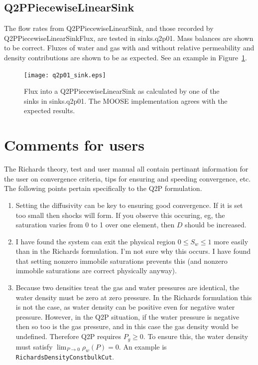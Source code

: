 \documentclass[]{scrreprt}
\begin{document}
\section{Q2PPiecewiseLinearSink}

The flow rates from Q2PPiecewiseLinearSink, and those recorded by
Q2PPiecewiseLinearSinkFlux, are tested in sinks.q2p01.  Mass balances
are shown to be correct.  Fluxes of water and gas with and without
relative permeability and density contributions are shown to be as
expected.  See an example in Figure~\ref{q2p01_sink.fig}.

\begin{figure}[htb]
\centering
\texttt{[image: q2p01\_sink.eps]}
\caption{Flux into a Q2PPiecewiseLinearSink as calculated by one of
  the sinks in sinks.q2p01.  The
  MOOSE implementation agrees with the expected results.}
\label{q2p01_sink.fig}
\end{figure}





\chapter{Comments for users}

The Richards theory, test and user manual all contain pertinant
information for the user on convergence criteria, tips for ensuring
and speeding convergence, etc.  The following points pertain
specifically to the Q2P formulation.

\begin{enumerate}
\item Setting the diffusivity can be key to ensuring good convergence.
  If it is set too small then shocks will form.  If you observe this
  occuring, eg, the saturation   varies from 0 to 1 over one element,
  then $D$ should be increased. 

\item I have found the system can exit the physical region $0\leq
  S_{w} \leq 1$ more easily than in the Richards formulation.  I'm not
  sure why this occurs.  I have found that setting nonzero immobile
  saturations prevents this (and nonzero immobile saturations are
  correct physically anyway).

\item Because two densities treat the gas and water pressures are
  identical, the water density must be zero at zero pressure.  In the
  Richards formulation this is not the case, as water density can be
  positive even for negative water pressure.  However, in the Q2P
  situation, if the water pressure is negative then so too is the gas
  pressure, and in this case the gas density would be undefined.
  Therefore Q2P requires $P_{g}\geq 0$.  To ensure this, the water
  density must satisfy $\lim_{P\rightarrow 0}\rho_{w}(P) = 0$.  An
  example is {\tt RichardsDensityConstbulkCut}.

\end{enumerate}
\end{document}
